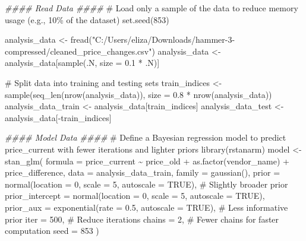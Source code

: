 \documentclass[
  letterpaper,
  DIV=11,
  numbers=noendperiod]{scrartcl}
\newenvironment{Shaded}{\begin{snugshade}}{\end{snugshade}}
\newcommand{\AttributeTok}[1]{\textcolor[rgb]{0.40,0.45,0.13}{#1}}
\newcommand{\CommentTok}[1]{\textcolor[rgb]{0.37,0.37,0.37}{#1}}
\newcommand{\ConstantTok}[1]{\textcolor[rgb]{0.56,0.35,0.01}{#1}}
\newcommand{\DecValTok}[1]{\textcolor[rgb]{0.68,0.00,0.00}{#1}}
\newcommand{\DocumentationTok}[1]{\textcolor[rgb]{0.37,0.37,0.37}{\textit{#1}}}
\newcommand{\FloatTok}[1]{\textcolor[rgb]{0.68,0.00,0.00}{#1}}
\newcommand{\FunctionTok}[1]{\textcolor[rgb]{0.28,0.35,0.67}{#1}}
\newcommand{\NormalTok}[1]{\textcolor[rgb]{0.00,0.23,0.31}{#1}}
\newcommand{\OtherTok}[1]{\textcolor[rgb]{0.00,0.23,0.31}{#1}}
\newcommand{\SpecialCharTok}[1]{\textcolor[rgb]{0.37,0.37,0.37}{#1}}
\newcommand{\StringTok}[1]{\textcolor[rgb]{0.13,0.47,0.30}{#1}}
\begin{document}
\begin{Shaded}
\begin{Highlighting}[]
\DocumentationTok{\#\#\#\# Read Data \#\#\#\#}
\CommentTok{\# Load only a sample of the data to reduce memory usage (e.g., 10\% of the dataset)}
\FunctionTok{set.seed}\NormalTok{(}\DecValTok{853}\NormalTok{)}

\NormalTok{analysis\_data }\OtherTok{\textless{}{-}} \FunctionTok{fread}\NormalTok{(}\StringTok{"C:/Users/eliza/Downloads/hammer{-}3{-}compressed/cleaned\_price\_changes.csv"}\NormalTok{)}
\NormalTok{analysis\_data }\OtherTok{\textless{}{-}}\NormalTok{ analysis\_data[}\FunctionTok{sample}\NormalTok{(.N, }\AttributeTok{size =} \FloatTok{0.1} \SpecialCharTok{*}\NormalTok{ .N)]}

\CommentTok{\# Split data into training and testing sets}
\NormalTok{train\_indices }\OtherTok{\textless{}{-}} \FunctionTok{sample}\NormalTok{(}\FunctionTok{seq\_len}\NormalTok{(}\FunctionTok{nrow}\NormalTok{(analysis\_data)), }\AttributeTok{size =} \FloatTok{0.8} \SpecialCharTok{*} \FunctionTok{nrow}\NormalTok{(analysis\_data))}
\NormalTok{analysis\_data\_train }\OtherTok{\textless{}{-}}\NormalTok{ analysis\_data[train\_indices]}
\NormalTok{analysis\_data\_test }\OtherTok{\textless{}{-}}\NormalTok{ analysis\_data[}\SpecialCharTok{{-}}\NormalTok{train\_indices]}

\DocumentationTok{\#\#\#\# Model Data \#\#\#\#}
\CommentTok{\# Define a Bayesian regression model to predict \textasciigrave{}price\_current\textasciigrave{} with fewer iterations and lighter priors}
\FunctionTok{library}\NormalTok{(rstanarm)}
\NormalTok{model }\OtherTok{\textless{}{-}} \FunctionTok{stan\_glm}\NormalTok{(}
  \AttributeTok{formula =}\NormalTok{ price\_current }\SpecialCharTok{\textasciitilde{}}\NormalTok{ price\_old }\SpecialCharTok{+} \FunctionTok{as.factor}\NormalTok{(vendor\_name) }\SpecialCharTok{+}\NormalTok{ price\_difference,}
  \AttributeTok{data =}\NormalTok{ analysis\_data\_train,}
  \AttributeTok{family =} \FunctionTok{gaussian}\NormalTok{(),}
  \AttributeTok{prior =} \FunctionTok{normal}\NormalTok{(}\AttributeTok{location =} \DecValTok{0}\NormalTok{, }\AttributeTok{scale =} \DecValTok{5}\NormalTok{, }\AttributeTok{autoscale =} \ConstantTok{TRUE}\NormalTok{),      }\CommentTok{\# Slightly broader prior}
  \AttributeTok{prior\_intercept =} \FunctionTok{normal}\NormalTok{(}\AttributeTok{location =} \DecValTok{0}\NormalTok{, }\AttributeTok{scale =} \DecValTok{5}\NormalTok{, }\AttributeTok{autoscale =} \ConstantTok{TRUE}\NormalTok{),}
  \AttributeTok{prior\_aux =} \FunctionTok{exponential}\NormalTok{(}\AttributeTok{rate =} \FloatTok{0.5}\NormalTok{, }\AttributeTok{autoscale =} \ConstantTok{TRUE}\NormalTok{),          }\CommentTok{\# Less informative prior}
  \AttributeTok{iter =} \DecValTok{500}\NormalTok{,                                                     }\CommentTok{\# Reduce iterations}
  \AttributeTok{chains =} \DecValTok{2}\NormalTok{,                                                     }\CommentTok{\# Fewer chains for faster computation}
  \AttributeTok{seed =} \DecValTok{853}
\NormalTok{)}
\end{Highlighting}
\end{Shaded}
\end{document}
